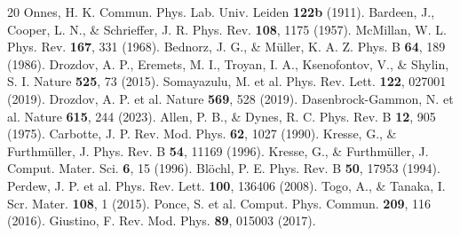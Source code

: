 \documentclass[twocolumn,superscriptaddress]{revtex4-2}
\begin{document}

\begin{thebibliography}{20}
 Onnes, H. K. Commun. Phys. Lab. Univ. Leiden \textbf{122b} (1911).
 Bardeen, J., Cooper, L. N., \& Schrieffer, J. R. Phys. Rev. \textbf{108}, 1175 (1957).
 McMillan, W. L. Phys. Rev. \textbf{167}, 331 (1968).
 Bednorz, J. G., \& M\"uller, K. A. Z. Phys. B \textbf{64}, 189 (1986).
 Drozdov, A. P., Eremets, M. I., Troyan, I. A., Ksenofontov, V., \& Shylin, S. I. Nature \textbf{525}, 73 (2015).
 Somayazulu, M. et al. Phys. Rev. Lett. \textbf{122}, 027001 (2019).
 Drozdov, A. P. et al. Nature \textbf{569}, 528 (2019).
 Dasenbrock-Gammon, N. et al. Nature \textbf{615}, 244 (2023).
 Allen, P. B., \& Dynes, R. C. Phys. Rev. B \textbf{12}, 905 (1975).
 Carbotte, J. P. Rev. Mod. Phys. \textbf{62}, 1027 (1990).
 Kresse, G., \& Furthm\"uller, J. Phys. Rev. B \textbf{54}, 11169 (1996).
 Kresse, G., \& Furthm\"uller, J. Comput. Mater. Sci. \textbf{6}, 15 (1996).
 Bl\"ochl, P. E. Phys. Rev. B \textbf{50}, 17953 (1994).
 Perdew, J. P. et al. Phys. Rev. Lett. \textbf{100}, 136406 (2008).
 Togo, A., \& Tanaka, I. Scr. Mater. \textbf{108}, 1 (2015).
 Ponce, S. et al. Comput. Phys. Commun. \textbf{209}, 116 (2016).
 Giustino, F. Rev. Mod. Phys. \textbf{89}, 015003 (2017).
\end{thebibliography}
\end{document}
